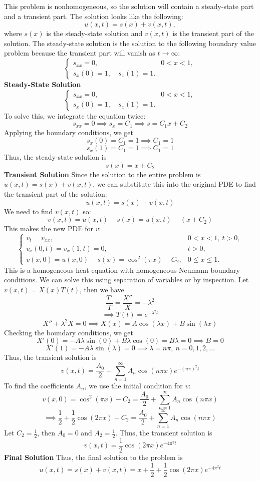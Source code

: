\documentclass[12pt]{article}
\begin{document}
\sol
This problem is nonhomogeneous, so the solution will contain a steady-state part and a transient part. The solution looks like the following:
\[
u(x,t) = s(x) + v(x,t),
\]
where $s(x)$ is the steady-state solution and $v(x,t)$ is the transient part of the solution. The steady-state solution is the solution to the following boundary value problem because the transient part will vanish as $t \to \infty$:
\[
\begin{cases}
s_{xx} = 0, & 0 < x < 1, \\
s_x(0) = 1,\quad s_x(1) = 1.
\end{cases}
\]
\textbf{Steady-State Solution}
\[
\begin{cases}
s_{xx} = 0, & 0 < x < 1, \\
s_x(0) = 1,\quad s_x(1) = 1.
\end{cases}
\]
To solve this, we integrate the equation twice:
\[
s_{xx} = 0 \implies s_x = C_1 \implies s = C_1 x + C_2
\]
Applying the boundary conditions, we get
\[
s_x(0) = C_1 = 1 \implies C_1 = 1
\]
\[
s_x(1) = C_1 = 1 \implies C_1 = 1
\]
Thus, the steady-state solution is
\[
s(x) = x + C_2
\]
\textbf{Transient Solution}
Since the solution to the entire problem is $u(x,t) = s(x) + v(x,t)$, we can substitute this into the original PDE to find the transient part of the solution:
\[
u(x,t) = s(x) + v(x,t)
\]
We need to find $v(x,t)$ so:
\[
v(x,t) = u(x,t) - s(x) = u(x,t) - (x + C_2)
\]
This makes the new PDE for $v$:
\[
\begin{cases}
v_t = v_{xx}, & 0 < x < 1,\ t > 0, \\
v_x(0,t) = v_x(1,t) = 0, & t > 0, \\
v(x,0) = u(x,0) - s(x) = \cos^2(\pi x) - C_2, & 0 \leq x \leq 1.
\end{cases}
\]
This is a homogeneous heat equation with homogeneous Neumann boundary conditions. We can solve this using separation of variables or by inspection. Let $v(x,t) = X(x)T(t)$, then we have
\[
\frac{T'}{T} = \frac{X''}{X} = -\lambda^2
\]
\[
\implies T(t) = e^{-\lambda^2 t}
\]
\[
X'' + \lambda^2 X = 0
\implies X(x) = A \cos(\lambda x) + B \sin(\lambda x)
\]
Checking the boundary conditions, we get
\[
X'(0) = -A \lambda \sin(0) + B \lambda \cos(0) = B \lambda = 0 \implies B = 0
\]
\[
X'(1) = -A \lambda \sin(\lambda) = 0 \implies \lambda = n\pi, \ n = 0,1,2,\dots
\]
Thus, the transient solution is
\[
v(x,t) = \frac{A_0}{2} + \sum_{n=1}^{\infty} A_n \cos(n\pi x) e^{-(n\pi)^2 t}
\]
To find the coefficients $A_n$, we use the initial condition for $v$:
\[
v(x,0) = \cos^2(\pi x) - C_2 = \frac{A_0}{2} + \sum_{n=1}^{\infty} A_n \cos(n\pi x)
\]
\[
\implies \frac{1}{2} + \frac{1}{2} \cos(2\pi x) - C_2 = \frac{A_0}{2} + \sum_{n=1}^{\infty} A_n \cos(n\pi x)
\]
Let $C_2 = \frac{1}{2}$, then $A_0 = 0$ and $A_2 = \frac{1}{2}$. Thus, the transient solution is
\[
v(x,t) = \frac{1}{2} \cos(2\pi x) e^{-4\pi^2 t}
\]
\textbf{Final Solution}
Thus, the final solution to the problem is
\[
\boxed{
u(x,t) = s(x) + v(x,t) = x + \frac{1}{2} + \frac{1}{2} \cos(2\pi x) e^{-4\pi^2 t}
}
\]
\end{document}
